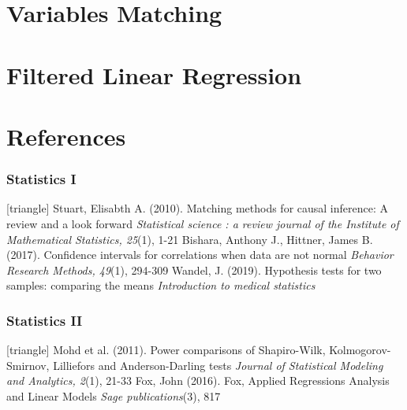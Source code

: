 \documentclass[xcolor=table]{beamer}
\begin{document}
\section{Variables Matching}

\section{Filtered Linear Regression}

\appendix

\section{References}
\begin{frame}
	\frametitle{Statistics I}
	\footnotesize{
		\begin{thebibliography}{99}
			[triangle]
			 Stuart, Elisabth A. (2010).
			\newblock Matching methods for causal inference: A review and a look forward
			\newblock \textit{Statistical science : a review journal of the Institute of Mathematical Statistics, 25}(1), 1-21
			\vspace{1mm}
			 Bishara, Anthony J., Hittner, James B. (2017).
			\newblock Confidence intervals for correlations when data are not normal
			\newblock \textit{Behavior Research Methods, 49}(1), 294-309
			\vspace{1mm}
			 Wandel, J. (2019).
			\newblock Hypothesis tests for two samples: comparing the means
			\newblock \textit{Introduction to medical statistics}
		\end{thebibliography}
	}
\end{frame}


\begin{frame}
	\frametitle{Statistics II}
	\footnotesize{
		\begin{thebibliography}{99}
			[triangle]
			 Mohd et al. (2011).
			\newblock Power comparisons of Shapiro-Wilk, Kolmogorov-Smirnov, Lilliefors and Anderson-Darling tests
			\newblock \textit{Journal of Statistical Modeling and Analytics, 2}(1), 21-33
			\vspace{1mm}
			 Fox, John (2016).
			\newblock Fox, Applied Regressions Analysis and Linear Models
			\newblock \textit{Sage publications}(3), 817
			\vspace{1mm}
		\end{thebibliography}
	}
\end{frame}
\end{document}
